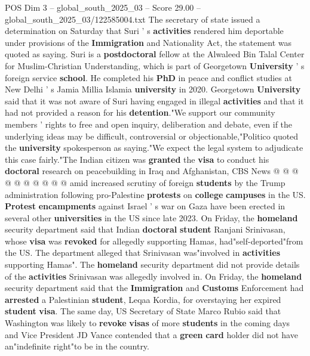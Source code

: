 \begin{textsample}{POS Dim 3 – global\_south\_2025\_03 – Score 29.00 – global\_south\_2025\_03/122585004.txt}
The secretary of state issued a determination on Saturday that Suri ' s \textbf{activities} rendered him deportable under provisions of the \textbf{Immigration} and Nationality Act, the statement was quoted as saying.
Suri is a \textbf{postdoctoral} fellow at the Alwaleed Bin Talal Center for Muslim-Christian Understanding, which is part of Georgetown \textbf{University} ' s foreign service \textbf{school}.
He completed his \textbf{PhD} in peace and conflict studies at New Delhi ' s Jamia Millia Islamia \textbf{university} in 2020.
Georgetown \textbf{University} said that it was not aware of Suri having engaged in illegal \textbf{activities} and that it had not provided a reason for his \textbf{detention}."We support our community members ' rights to free and open inquiry, deliberation and debate, even if the underlying ideas may be difficult, controversial or objectionable,"Politico quoted the \textbf{university} spokesperson as saying."We expect the legal system to adjudicate this case fairly."The Indian citizen was \textbf{granted} the \textbf{visa} to conduct his \textbf{doctoral} research on peacebuilding in Iraq and Afghanistan, CBS News @ @ @ @ @ @ @ @ @ @ amid increased scrutiny of foreign \textbf{students} by the Trump administration following pro-Palestine \textbf{protests} on \textbf{college} \textbf{campuses} in the US. \textbf{Protest} \textbf{encampments} against Israel ' s war on Gaza have been erected in several other \textbf{universities} in the US since late 2023.
On Friday, the \textbf{homeland} security department said that Indian \textbf{doctoral} \textbf{student} Ranjani Srinivasan, whose \textbf{visa} was \textbf{revoked} for allegedly supporting Hamas, had"self-deported"from the US.
The department alleged that Srinivasan was"involved in \textbf{activities} supporting Hamas".
The \textbf{homeland} security department did not provide details of the \textbf{activities} Srinivasan was allegedly involved in.
On Friday, the \textbf{homeland} security department said that the \textbf{Immigration} and \textbf{Customs} Enforcement had \textbf{arrested} a Palestinian \textbf{student}, Leqaa Kordia, for overstaying her expired \textbf{student} \textbf{visa}.
The same day, US Secretary of State Marco Rubio said that Washington was likely to \textbf{revoke} \textbf{visas} of more \textbf{students} in the coming days and Vice President JD Vance contended that a \textbf{green} \textbf{card} holder did not have an"indefinite right"to be in the country.

\end{textsample}
